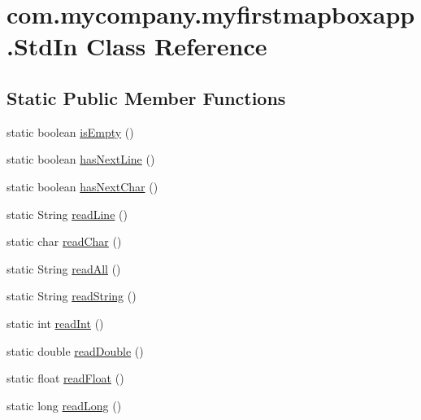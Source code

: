 \hypertarget{classcom_1_1mycompany_1_1myfirstmapboxapp_1_1_std_in}{}\section{com.\+mycompany.\+myfirstmapboxapp.\+Std\+In Class Reference}
\label{classcom_1_1mycompany_1_1myfirstmapboxapp_1_1_std_in}
\subsection*{Static Public Member Functions}
\begin{DoxyCompactItemize}
\item 
static boolean \hyperlink{classcom_1_1mycompany_1_1myfirstmapboxapp_1_1_std_in_a4fbe6689243808b7cb6b38b4369983df}{is\+Empty} ()
\item 
static boolean \hyperlink{classcom_1_1mycompany_1_1myfirstmapboxapp_1_1_std_in_ace5ddf1a9d8a3aacb85be47296327502}{has\+Next\+Line} ()
\item 
static boolean \hyperlink{classcom_1_1mycompany_1_1myfirstmapboxapp_1_1_std_in_ab46430a80e71ad8adc86ac0c068c20be}{has\+Next\+Char} ()
\item 
static String \hyperlink{classcom_1_1mycompany_1_1myfirstmapboxapp_1_1_std_in_a0ce2aa1a4c057b28a34bd07c54c45545}{read\+Line} ()
\item 
static char \hyperlink{classcom_1_1mycompany_1_1myfirstmapboxapp_1_1_std_in_ab6468a980b4dba835a5168734d16ef31}{read\+Char} ()
\item 
static String \hyperlink{classcom_1_1mycompany_1_1myfirstmapboxapp_1_1_std_in_ab88a5cfd29a5481fc1c3dc3a5ba72404}{read\+All} ()
\item 
static String \hyperlink{classcom_1_1mycompany_1_1myfirstmapboxapp_1_1_std_in_aa787874d0065ebeb864a06b137a0250e}{read\+String} ()
\item 
static int \hyperlink{classcom_1_1mycompany_1_1myfirstmapboxapp_1_1_std_in_a5eafdf9c8e8d7e60b99642cb335c9175}{read\+Int} ()
\item 
static double \hyperlink{classcom_1_1mycompany_1_1myfirstmapboxapp_1_1_std_in_a4eeca1a8d8f9ab168bbe9ddf87d9f3e5}{read\+Double} ()
\item 
static float \hyperlink{classcom_1_1mycompany_1_1myfirstmapboxapp_1_1_std_in_abbbb99b032bdedf7eaaef4282b8a33ab}{read\+Float} ()
\item 
static long \hyperlink{classcom_1_1mycompany_1_1myfirstmapboxapp_1_1_std_in_a0d4385fe7654b65b28f79deb65bb973a}{read\+Long} ()

\end{DoxyCompactItemize}
